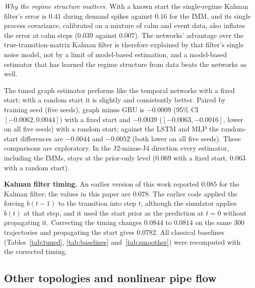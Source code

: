 \documentclass[conference]{IEEEtran}
\begin{document}
\emph{Why the regime structure matters.} With a known start the single-regime Kalman filter's error is $0.41$ during demand spikes against $0.16$ for the IMM, and its single process covariance, calibrated on a mixture of calm and event data, also inflates the error at calm steps ($0.039$ against $0.007$). The networks' advantage over the true-transition-matrix Kalman filter is therefore explained by that filter's single noise model, not by a limit of model-based estimation, and a model-based estimator that has learned the regime structure from data beats the networks as well.

The tuned graph estimator performs like the temporal networks with a fixed start; with a random start it is slightly and consistently better. Paired by training seed (five seeds), graph minus GRU is $-0.0009$ (95\% CI $[-0.0062,0.0044]$) with a fixed start and $-0.0039$ ($[-0.0063,-0.0016]$, lower on all five seeds) with a random start; against the LSTM and MLP the random-start differences are $-0.0044$ and $-0.0052$ (both lower on all five seeds). These comparisons are exploratory. In the J2-minus-J4 direction every estimator, including the IMMs, stays at the prior-only level ($0.069$ with a fixed start, $0.063$ with a random start).

\textbf{Kalman filter timing.} An earlier version of this work reported $0.085$ for the Kalman filter; the values in this paper are $0.078$. The earlier code applied the forcing $b(t-1)$ to the transition into step $t$, although the simulator applies $b(t)$ at that step, and it used the start prior as the prediction at $t=0$ without propagating it. Correcting the timing changes $0.0844$ to $0.0814$ on the same 300 trajectories and propagating the start gives $0.0782$. All classical baselines (Tables~\ref{tab:tuned}, \ref{tab:baselines} and~\ref{tab:smoother}) were recomputed with the corrected timing.

\subsection{Other topologies and nonlinear pipe flow}
\label{sec:topo_est}
\end{document}
